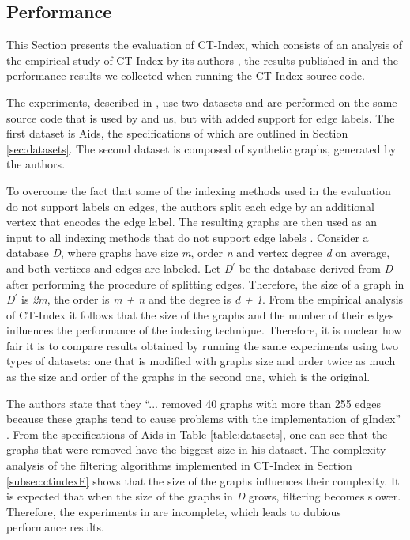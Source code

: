 \documentclass{l4proj}
\begin{document}
\subsection{Performance}
\label{subsec:ctindexEval}
This Section presents the evaluation of CT-Index, which consists of an analysis of the empirical study of CT-Index by its authors \cite{ctindex}, the results published in \cite{foteini} and the performance results we collected when running the CT-Index source code.

The experiments, described in \cite{ctindex}, use two datasets and are performed on the same source code that is used by \cite{foteini} and us, but with added support for edge labels. The first dataset is Aids, the specifications of which are outlined in Section \ref{sec:datasets}. The second dataset is composed of synthetic graphs, generated by the authors.

To overcome the fact that some of the indexing methods used in the evaluation do not support labels on edges, the authors split each edge by an additional vertex that encodes the edge label. The resulting graphs are then used as an input to all indexing methods that do not support edge labels \cite{ctindex}. Consider a database \emph{D}, where graphs have size \emph{m}, order \emph{n} and vertex degree \emph{d} on average, and both vertices and edges are labeled. Let \emph{D$^\prime$} be the database derived from \emph{D} after performing the procedure of splitting edges. Therefore, the size of a graph in \emph{D$^\prime$} is \emph{2m}, the order is \emph{m + n} and the degree is \emph{d + 1}. From the empirical analysis of CT-Index it follows that the size of the graphs and the number of their edges influences the performance of the indexing technique. Therefore, it is unclear how fair it is to compare results obtained by running the same experiments using two types of datasets: one that is modified with graphs size and order twice as much as the size and order of the graphs in the second one, which is the original.
 
The authors state that they ``... removed 40 graphs with more than 255 edges because these graphs tend to cause problems with the implementation of gIndex'' \cite{ctindex}. From the specifications of Aids in Table \ref{table:datasets}, one can see that the graphs that were removed have the biggest size in his dataset. The complexity analysis of the filtering algorithms implemented in CT-Index in Section \ref{subsec:ctindexF} shows that the size of the graphs influences their complexity. It is expected that when the size of the graphs in \emph{D} grows, filtering becomes slower. Therefore, the experiments in \cite{ctindex} are incomplete, which leads to dubious performance results.
\end{document}

